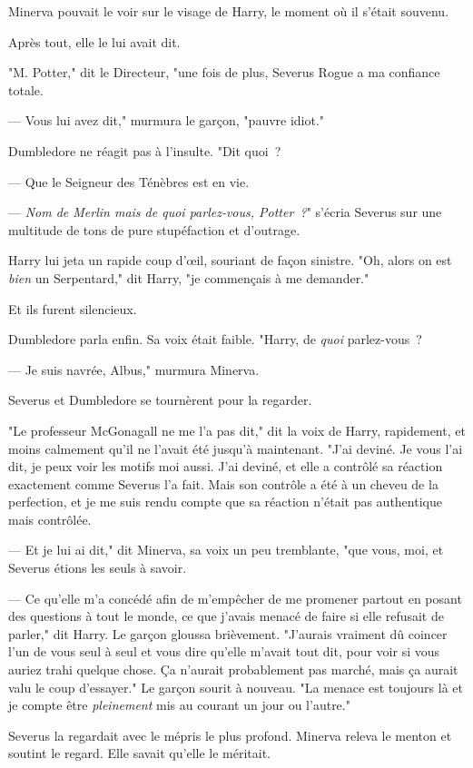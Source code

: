 Minerva pouvait le voir sur le visage de Harry, le moment où il s'était souvenu.

Après tout, elle le lui avait dit.

"M. Potter," dit le Directeur, "une fois de plus, Severus Rogue a ma confiance totale.

--- Vous lui avez dit," murmura le garçon, "pauvre idiot."

Dumbledore ne réagit pas à l'insulte. "Dit quoi~?

--- Que le Seigneur des Ténèbres est en vie.

--- \emph{Nom de Merlin mais de quoi parlez-vous, Potter~?}" s'écria Severus sur une multitude de tons de pure stupéfaction et d'outrage.

Harry lui jeta un rapide coup d'œil, souriant de façon sinistre. "Oh, alors on est \emph{bien} un Serpentard," dit Harry, "je commençais à me demander."

Et ils furent silencieux.

Dumbledore parla enfin. Sa voix était faible. "Harry, de \emph{quoi} parlez-vous~?

--- Je suis navrée, Albus," murmura Minerva.

Severus et Dumbledore se tournèrent pour la regarder.

"Le professeur McGonagall ne me l'a pas dit," dit la voix de Harry, rapidement, et moins calmement qu'il ne l'avait été jusqu'à maintenant. "J'ai deviné. Je vous l'ai dit, je peux voir les motifs moi aussi. J'ai deviné, et elle a contrôlé sa réaction exactement comme Severus l'a fait. Mais son contrôle a été à un cheveu de la perfection, et je me suis rendu compte que sa réaction n'était pas authentique mais contrôlée.

--- Et je lui ai dit," dit Minerva, sa voix un peu tremblante, "que vous, moi, et Severus étions les seuls à savoir.

--- Ce qu'elle m'a concédé afin de m'empêcher de me promener partout en posant des questions à tout le monde, ce que j'avais menacé de faire si elle refusait de parler," dit Harry. Le garçon gloussa brièvement. "J'aurais vraiment dû coincer l'un de vous seul à seul et vous dire qu'elle m'avait tout dit, pour voir si vous auriez trahi quelque chose. Ça n'aurait probablement pas marché, mais ça aurait valu le coup d'essayer." Le garçon sourit à nouveau. "La menace est toujours là et je compte être \emph{pleinement} mis au courant un jour ou l'autre."

Severus la regardait avec le mépris le plus profond. Minerva releva le menton et soutint le regard. Elle savait qu'elle le méritait.


